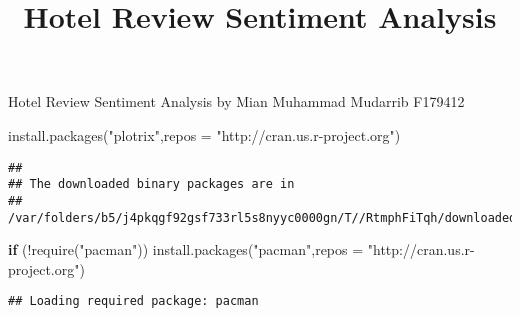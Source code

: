 \documentclass[
]{article}
\title{Hotel Review Sentiment Analysis}
\author{}
\date{\vspace{-2.5em}}
\newenvironment{Shaded}{\begin{snugshade}}{\end{snugshade}}
\newcommand{\AttributeTok}[1]{\textcolor[rgb]{0.77,0.63,0.00}{#1}}
\newcommand{\ControlFlowTok}[1]{\textcolor[rgb]{0.13,0.29,0.53}{\textbf{#1}}}
\newcommand{\FunctionTok}[1]{\textcolor[rgb]{0.00,0.00,0.00}{#1}}
\newcommand{\NormalTok}[1]{#1}
\newcommand{\SpecialCharTok}[1]{\textcolor[rgb]{0.00,0.00,0.00}{#1}}
\newcommand{\StringTok}[1]{\textcolor[rgb]{0.31,0.60,0.02}{#1}}
\begin{document}
\maketitle

Hotel Review Sentiment Analysis by Mian Muhammad Mudarrib F179412

\begin{Shaded}
\begin{Highlighting}[]
\FunctionTok{install.packages}\NormalTok{(}\StringTok{"plotrix"}\NormalTok{,}\AttributeTok{repos =} \StringTok{"http://cran.us.r{-}project.org"}\NormalTok{)}
\end{Highlighting}
\end{Shaded}

\begin{verbatim}
## 
## The downloaded binary packages are in
##  /var/folders/b5/j4pkqgf92gsf733rl5s8nyyc0000gn/T//RtmphFiTqh/downloaded_packages
\end{verbatim}

\begin{Shaded}
\begin{Highlighting}[]
\ControlFlowTok{if}\NormalTok{ (}\SpecialCharTok{!}\FunctionTok{require}\NormalTok{(}\StringTok{"pacman"}\NormalTok{)) }\FunctionTok{install.packages}\NormalTok{(}\StringTok{"pacman"}\NormalTok{,}\AttributeTok{repos =} \StringTok{"http://cran.us.r{-}project.org"}\NormalTok{)}
\end{Highlighting}
\end{Shaded}

\begin{verbatim}
## Loading required package: pacman
\end{verbatim}
\end{document}
